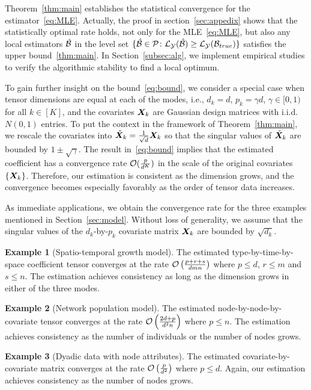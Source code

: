 \documentclass[12pt]{article}
\theoremstyle{plain}
\theoremstyle{definition}
\newtheorem{example}{Example}
\begin{document}
Theorem~\ref{thm:main} establishes the statistical convergence for the estimator~\eqref{eq:MLE}. Actually, the proof in section~\ref{sec:appedix} shows that the statistically optimal rate holds, not only for the MLE~\eqref{eq:MLE},  but also any local estimators $\hat {\mathcal{B}}$ in the level set $\{\hat {\mathcal{B}} \in \mathcal{P} \colon \mathcal{L}_{\mathcal{Y}} (\hat {\mathcal{B}}) \geq \mathcal{L}_{\mathcal{Y}} (\mathcal{B}_{true}) \}$ satisfies the upper bound~\ref{thm:main}. In Section~\ref{subsec:alg}, we implement empirical studies to verify the algorithmic stability to find a local optimum.


To gain further insight on the bound~\eqref{eq:bound}, we consider a special case when tensor dimensions are equal at each of the modes, i.e., $d_k=d$, $p_k=\gamma d$, $\gamma\in [0,1)$ for all $k\in[K]$, and the covariates $\bm X_k$ are Gaussian design matrices with i.i.d.\ $N(0,1)$ entries. To put the context in the framework of Theorem~\ref{thm:main}, we rescale the covariates into $\check {\bm X}_k={1\over \sqrt{d}}\bm X_k$ so that the singular values of $\check {\bm X}_k$ are bounded by $1\pm \sqrt{\gamma}$. The result in~\eqref{eq:bound} implies that the estimated coefficient has a convergence rate $\mathcal{O}({p\over d^K})$ in the scale of the original covariates $\{\bm X_k\}$. Therefore, our estimation is consistent as the dimension grows, and the convergence becomes especially favorably as the order of tensor data increases. 

As immediate applications, we obtain the convergence rate for the three examples mentioned in Section~\ref{sec:model}. Without loss of generality, we assume that the singular values of the $d_k$-by-$p_k$ covariate matrix $\bm X_k$ are bounded by $\sqrt{d_k}$. 


\begin{example}[Spatio-temporal growth model] The estimated type-by-time-by-space coefficient tensor converges at the rate $\mathcal{O}\left({p+r+s\over dmn}\right)$ where $p\leq d$, $r\leq m$ and $s\leq n$. The estimation achieves consistency as long as the dimension grows in either of the three modes.
\end{example}

\begin{example} [Network population model] The estimated node-by-node-by-covariate tensor converges at the rate $\mathcal{O}\left({2d+p\over d^2n}\right)$ where $p\leq n$. The estimation achieves consistency as the number of individuals or the number of nodes grows. 
\end{example}

\begin{example} [Dyadic data with node attributes] The estimated covariate-by-covariate matrix converges at the rate $\mathcal{O}\left({p\over d^2}\right)$ where $p\leq d$. Again, our estimation achieves consistency as the number of nodes grows. 
\end{example}
\end{document}
